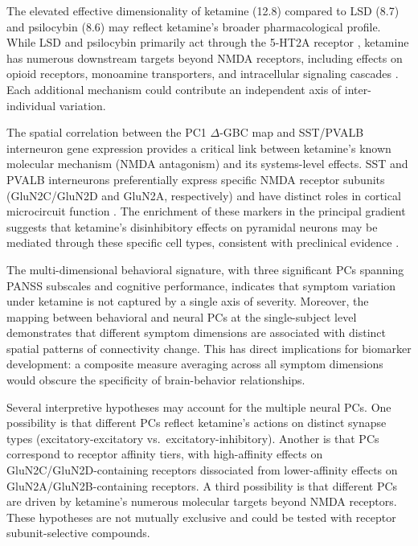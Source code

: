 \documentclass[11pt]{article}
\begin{document}
The elevated effective dimensionality of ketamine (12.8) compared to LSD (8.7) and psilocybin (8.6) may reflect ketamine's broader pharmacological profile. While LSD and psilocybin primarily act through the 5-HT2A receptor \citep{vollenweider2010, carhart2016, preller2018}, ketamine has numerous downstream targets beyond NMDA receptors, including effects on opioid receptors, monoamine transporters, and intracellular signaling cascades \citep{duman2016}. Each additional mechanism could contribute an independent axis of inter-individual variation.

The spatial correlation between the PC1 $\Delta$-GBC map and SST/PVALB interneuron gene expression provides a critical link between ketamine's known molecular mechanism (NMDA antagonism) and its systems-level effects. SST and PVALB interneurons preferentially express specific NMDA receptor subunits (GluN2C/GluN2D and GluN2A, respectively) and have distinct roles in cortical microcircuit function \citep{homayoun2007, tremblay2016}. The enrichment of these markers in the principal gradient suggests that ketamine's disinhibitory effects on pyramidal neurons may be mediated through these specific cell types, consistent with preclinical evidence \citep{moghaddam1997}.

The multi-dimensional behavioral signature, with three significant PCs spanning PANSS subscales and cognitive performance, indicates that symptom variation under ketamine is not captured by a single axis of severity. Moreover, the mapping between behavioral and neural PCs at the single-subject level demonstrates that different symptom dimensions are associated with distinct spatial patterns of connectivity change. This has direct implications for biomarker development: a composite measure averaging across all symptom dimensions would obscure the specificity of brain-behavior relationships.

Several interpretive hypotheses may account for the multiple neural PCs. One possibility is that different PCs reflect ketamine's actions on distinct synapse types (excitatory-excitatory vs.\ excitatory-inhibitory). Another is that PCs correspond to receptor affinity tiers, with high-affinity effects on GluN2C/GluN2D-containing receptors dissociated from lower-affinity effects on GluN2A/GluN2B-containing receptors. A third possibility is that different PCs are driven by ketamine's numerous molecular targets beyond NMDA receptors. These hypotheses are not mutually exclusive and could be tested with receptor subunit-selective compounds.
\end{document}
